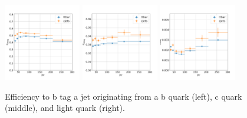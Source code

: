 \begin{figure}[h!]
    \centering
    \includegraphics[width=0.3\textwidth]{chapters/Appendix/sectionBtag/figures/bmva_mceff_vs_pt_b}
    \includegraphics[width=0.3\textwidth]{chapters/Appendix/sectionBtag/figures/bmva_mceff_vs_pt_c}
    \includegraphics[width=0.3\textwidth]{chapters/Appendix/sectionBtag/figures/bmva_mceff_vs_pt_usdg}
    \caption{Efficiency to b tag a jet originating from a b quark (left), c quark (middle), and light quark (right).
    \label{fig:btag_eff}
    }
\end{figure}

\FloatBarrier

